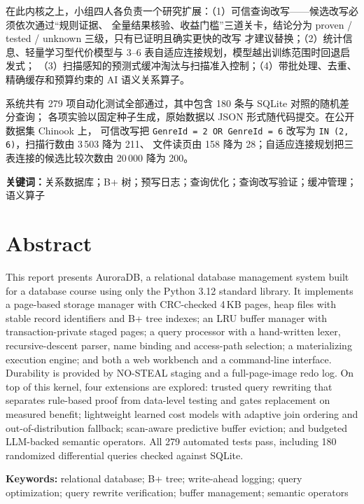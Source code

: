 \documentclass[a4paper,zihao=-4,UTF8,fontset=windows,linespread=1.35]{ctexart}
\begin{document}
在此内核之上，小组四人各负责一个研究扩展：（1）可信查询改写——候选改写必须依次通过“规则证据、
全量结果核验、收益门槛”三道关卡，结论分为 proven / tested / unknown 三级，只有已证明且确实更快的改写
才建议替换；（2）统计信息、轻量学习型代价模型与 3--6 表自适应连接规划，模型越出训练范围时回退启发式；
（3）扫描感知的预测式缓冲淘汰与扫描准入控制；（4）带批处理、去重、精确缓存和预算约束的 AI 语义关系算子。

系统共有 279 项自动化测试全部通过，其中包含 180 条与 SQLite 对照的随机差分查询；
各项实验以固定种子生成，原始数据以 JSON 形式随代码提交。在公开数据集 Chinook 上，
可信改写把 \texttt{GenreId = 2 OR GenreId = 6} 改写为 \texttt{IN (2, 6)}，扫描行数由 3\,503 降为 211、
文件读页由 158 降为 28；自适应连接规划把三表连接的候选比较次数由 20\,000 降为 200。

\noindent\textbf{关键词：}关系数据库；B+ 树；预写日志；查询优化；查询改写验证；缓冲管理；语义算子

\clearpage
\section*{Abstract}

This report presents AuroraDB, a relational database management system built for a database course
using only the Python 3.12 standard library. It implements a page-based storage manager with CRC-checked
4\,KB pages, heap files with stable record identifiers and B+ tree indexes; an LRU buffer manager with
transaction-private staged pages; a query processor with a hand-written lexer, recursive-descent parser,
name binding and access-path selection; a materializing execution engine; and both a web workbench and
a command-line interface. Durability is provided by NO-STEAL staging and a full-page-image redo log.
On top of this kernel, four extensions are explored: trusted query rewriting that separates rule-based
proof from data-level testing and gates replacement on measured benefit; lightweight learned cost models
with adaptive join ordering and out-of-distribution fallback; scan-aware predictive buffer eviction;
and budgeted LLM-backed semantic operators. All 279 automated tests pass, including 180 randomized
differential queries checked against SQLite.

\noindent\textbf{Keywords:} relational database; B+ tree; write-ahead logging; query optimization;
query rewrite verification; buffer management; semantic operators

\clearpage
\setcounter{tocdepth}{2}
\tableofcontents
\clearpage
{}
\end{document}
